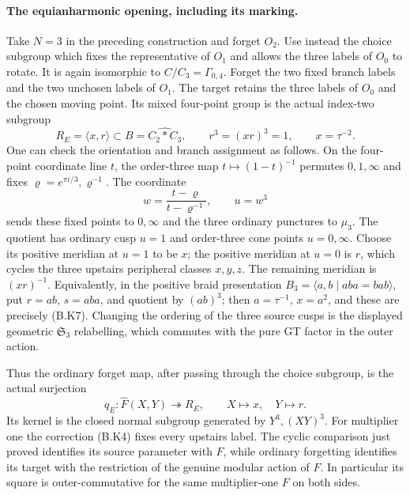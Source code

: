 \paragraph{The equianharmonic opening, including its marking.}
Take $N=3$ in the preceding construction and forget $O_2$.
Use instead the choice subgroup which fixes the representative
of $O_1$ and allows the three labels of $O_0$ to rotate.
It is again isomorphic to $C/C_3=\Gamma_{0,4}$.  Forget the two
fixed branch labels and the two unchosen labels of $O_1$.
The target retains the three labels of $O_0$ and the chosen
moving point.  Its mixed four-point group is the actual
index-two subgroup
\[
 R_E=\langle x,r\rangle\subset B=\widehat{C_2*C_3},
 \qquad r^3=(xr)^3=1,\qquad x=\tau^{-2}.                \tag{B.K7}
\]
One can check the orientation and branch assignment as follows.
On the four-point coordinate line $t$, the order-three map
$t\mapsto(1-t)^{-1}$ permutes $0,1,\infty$ and fixes
$\varrho=e^{\pi i/3},\varrho^{-1}$.  The coordinate
\[
 w=\frac{t-\varrho}{t-\varrho^{-1}},\qquad u=w^3          \tag{B.K8}
\]
sends these fixed points to $0,\infty$ and the three ordinary
punctures to $\mu_3$.  The quotient has ordinary cusp $u=1$
and order-three cone points $u=0,\infty$.  Choose its positive
meridian at $u=1$ to be $x$; the positive meridian at $u=0$ is
$r$, which cycles the three upstairs peripheral classes
$x,y,z$.  The remaining meridian is $(xr)^{-1}$.  Equivalently,
in the positive braid presentation $B_3=\langle a,b\mid aba=bab\rangle$,
put $r=ab$, $s=aba$, and quotient by $(ab)^3$; then
$a=\tau^{-1}$, $x=a^2$, and these are precisely (B.K7).
Changing the ordering of the three source cusps is the displayed
geometric $\mathfrak S_3$ relabelling, which commutes with the
pure GT factor in the outer action.

Thus the ordinary forget map, after passing through the choice
subgroup, is the actual surjection
\[
 q_E:\widehat F(X,Y)\twoheadrightarrow R_E,\qquad
              X\mapsto x,\quad Y\mapsto r.             \tag{B.K9}
\]
Its kernel is the closed normal subgroup generated by
$Y^3,(XY)^3$.  For multiplier one the correction (B.K4) fixes every
upstairs label.  The cyclic comparison just proved identifies
its source parameter with $F$, while ordinary forgetting
identifies its target with the restriction of the genuine
modular action of $F$.  In particular its square is
outer-commutative for the same multiplier-one $F$ on both sides.

